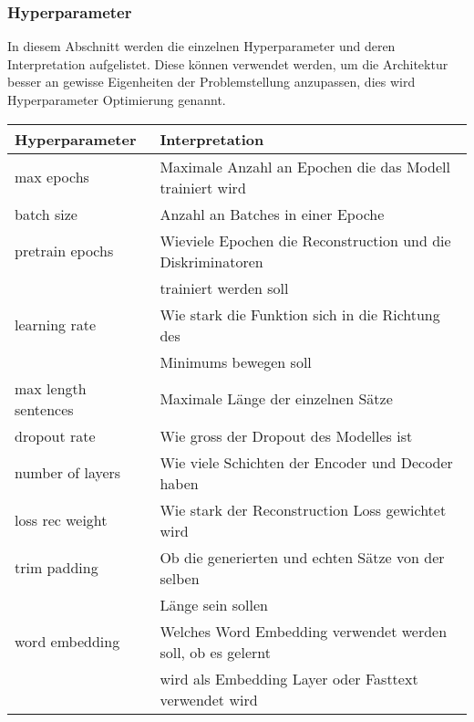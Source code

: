 \subsubsection{Hyperparameter}
\label{sub:crontrol_gen_hyperparameter}
In diesem Abschnitt werden die einzelnen Hyperparameter und deren Interpretation aufgelistet. Diese können verwendet
werden, um die Architektur besser an gewisse Eigenheiten der Problemstellung anzupassen, dies wird Hyperparameter
Optimierung genannt.
\begin{table}[ht]
	\centering
	\begin{tabular}{| l | l |}
	\hline
	\textbf{Hyperparameter} & \textbf{Interpretation}                                     \\ \hline
	max epochs              & Maximale Anzahl an Epochen die das Modell trainiert wird    \\ \hline
	batch size              & Anzahl an Batches in einer Epoche                           \\ \hline
	pretrain epochs         & Wieviele Epochen die Reconstruction und die Diskriminatoren \\
	                        & trainiert werden soll                                       \\ \hline
	learning rate           & Wie stark die Funktion sich in die Richtung des             \\ 
	                        & Minimums bewegen soll                                       \\ \hline
    max length sentences    & Maximale Länge der einzelnen Sätze                          \\ \hline  
	dropout rate            & Wie gross der Dropout des Modelles ist                      \\ \hline
	number of layers        & Wie viele Schichten der Encoder und Decoder haben           \\ \hline
	loss rec weight         & Wie stark der Reconstruction Loss gewichtet wird            \\ \hline
	trim padding            & Ob die generierten und echten Sätze von der selben          \\
	                        & Länge sein sollen                                           \\ \hline
	word embedding          & Welches Word Embedding verwendet werden soll, ob es gelernt \\
	                        & wird als Embedding Layer oder Fasttext verwendet wird       \\ \hline

\end{tabular}
\end{table}
